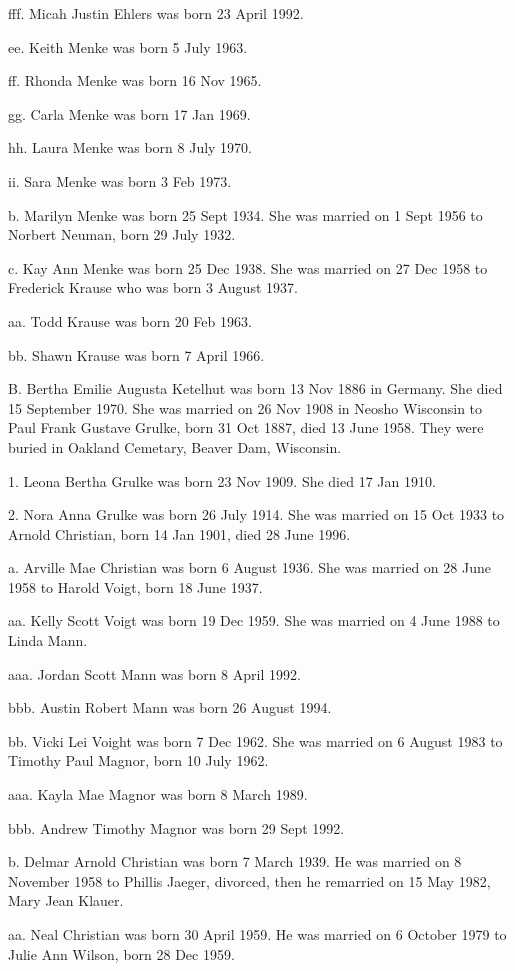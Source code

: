 \documentclass[a4paper]{article}
\begin{document}
fff. Micah Justin Ehlers was born 23 April 1992.

ee. Keith Menke was born 5 July 1963.

ff. Rhonda Menke was born 16 Nov 1965.

gg. Carla Menke was born 17 Jan 1969.

hh. Laura Menke was born 8 July 1970.

ii. Sara Menke was born 3 Feb 1973.

b. Marilyn Menke was born 25 Sept 1934.  She was married on 1 Sept 1956 to Norbert Neuman, born 29 July 1932.

c. Kay Ann Menke was born 25 Dec 1938.  She was married on 27 Dec 1958 to Frederick Krause who was born 3 August 1937.

aa. Todd Krause was born 20 Feb 1963.

bb. Shawn Krause was born 7 April 1966.

B. Bertha Emilie Augusta Ketelhut was born 13 Nov 1886 in Germany.  She died 15 September 1970.  She was married on 26 Nov 1908 in Neosho Wisconsin to Paul Frank Gustave Grulke, born 31 Oct 1887, died 13 June 1958.  They were buried in Oakland Cemetary, Beaver Dam, Wisconsin.

1. Leona Bertha Grulke was born 23 Nov 1909.  She died 17 Jan 1910.

2. Nora Anna Grulke was born 26 July 1914.  She was married on 15 Oct 1933 to Arnold Christian, born 14 Jan 1901, died 28 June 1996.

a. Arville Mae Christian was born 6 August 1936.  She was married on 28 June 1958 to Harold Voigt, born 18 June 1937.

aa. Kelly Scott Voigt  was born 19 Dec 1959.  She was married on 4 June 1988 to Linda Mann.

aaa. Jordan Scott Mann was born 8 April 1992.

bbb. Austin Robert Mann was born 26 August 1994.
				
bb. Vicki Lei Voight was born 7 Dec 1962.  She was married on 6 August 1983 to Timothy Paul Magnor, born 10 July 1962.

aaa. Kayla Mae Magnor was born 8 March 1989.

bbb. Andrew Timothy Magnor was born 29 Sept 1992.

b. Delmar Arnold Christian was born 7 March 1939.  He was married on 8 November 1958 to Phillis Jaeger, divorced, then he remarried on 15 May 1982, Mary Jean Klauer.

aa. Neal Christian was born 30 April 1959.  He was married on 6 October 1979 to Julie Ann Wilson, born 28 Dec 1959.
\end{document}
